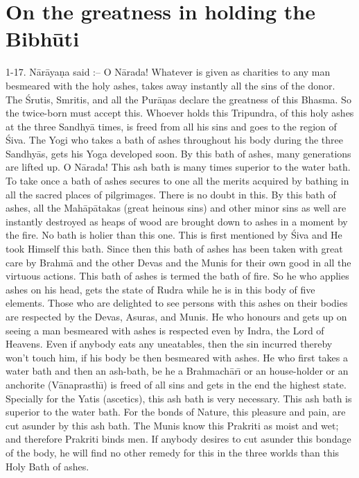 \chapter{On the greatness in holding the Bibh\=uti}

1-17. N\=ar\=aya\d{n}a said :-- O N\=arada! Whatever is given as charities to any man besmeared with the holy ashes, takes away instantly all the sins of the donor. The \'Srutis, Smritis, and all the Pur\=a\d{n}as declare the greatness of this Bhasma. So the twice-born must accept this. Whoever holds this Tripundra, of this holy ashes at the three Sandhy\=a times, is freed from all his sins and goes to the region of \'Siva. The Yogi who takes a bath of ashes throughout his body during the three Sandhy\=as, gets his Yoga developed soon. By this bath of ashes, many generations are lifted up. O N\=arada! This ash bath is many times superior to the water bath. To take once a bath of ashes secures to one all the merits acquired by bathing in all the sacred places of pilgrimages. There is no doubt in this. By this bath of ashes, all the Mah\=ap\=atakas (great heinous sins) and other minor sins as well are instantly destroyed as heaps of wood are brought down to ashes in a moment by the fire. No bath is holier than this one. This is first mentioned by \'Siva and He took Himself this bath. Since then this bath of ashes has been taken with great care by Brahm\=a and the other Devas and the Munis for their own good in all the virtuous actions. This bath of ashes is termed the bath of fire. So he who applies ashes on his head, gets the state of Rudra while he is in this body of five elements. Those who are delighted to see persons with this ashes on their bodies are respected by the Devas, Asuras, and Munis. He who honours and gets up on seeing a man besmeared with ashes is respected even by Indra, the Lord of Heavens. Even if anybody eats any uneatables, then the sin incurred thereby won't touch him, if his body be then besmeared with ashes. He who first takes a water bath and then an ash-bath, be he a Brahmach\=ar\={\i} or an house-holder or an anchorite (V\=anaprasth\={\i}) is freed of all sins and gets in the end the highest state. Specially for the Yatis (ascetics), this ash bath is very necessary. This ash bath is superior to the water bath. For the bonds of Nature, this pleasure and pain, are cut asunder by this ash bath. The Munis know this Prakriti as moist and wet; and therefore Prakriti binds men. If anybody desires to cut asunder this bondage of the body, he will find no other remedy for this in the three worlds than this Holy Bath of ashes.

